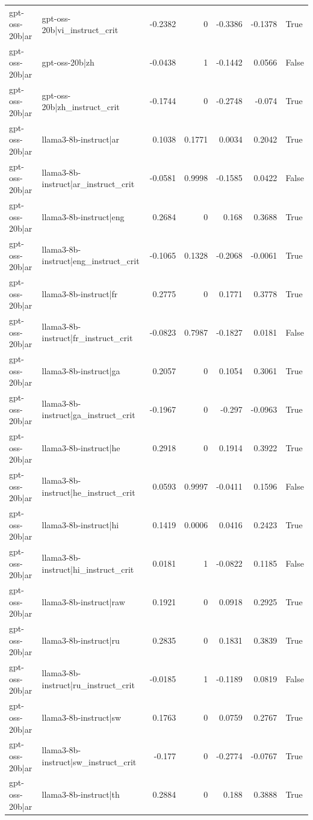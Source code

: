 \begin{table}
\begin{tabular}{l l r r r r l}
gpt-oss-20b|ar & gpt-oss-20b|vi_instruct_crit & -0.2382 & 0 & -0.3386 & -0.1378 & True \\
gpt-oss-20b|ar & gpt-oss-20b|zh & -0.0438 & 1 & -0.1442 & 0.0566 & False \\
gpt-oss-20b|ar & gpt-oss-20b|zh_instruct_crit & -0.1744 & 0 & -0.2748 & -0.074 & True \\
gpt-oss-20b|ar & llama3-8b-instruct|ar & 0.1038 & 0.1771 & 0.0034 & 0.2042 & True \\
gpt-oss-20b|ar & llama3-8b-instruct|ar_instruct_crit & -0.0581 & 0.9998 & -0.1585 & 0.0422 & False \\
gpt-oss-20b|ar & llama3-8b-instruct|eng & 0.2684 & 0 & 0.168 & 0.3688 & True \\
gpt-oss-20b|ar & llama3-8b-instruct|eng_instruct_crit & -0.1065 & 0.1328 & -0.2068 & -0.0061 & True \\
gpt-oss-20b|ar & llama3-8b-instruct|fr & 0.2775 & 0 & 0.1771 & 0.3778 & True \\
gpt-oss-20b|ar & llama3-8b-instruct|fr_instruct_crit & -0.0823 & 0.7987 & -0.1827 & 0.0181 & False \\
gpt-oss-20b|ar & llama3-8b-instruct|ga & 0.2057 & 0 & 0.1054 & 0.3061 & True \\
gpt-oss-20b|ar & llama3-8b-instruct|ga_instruct_crit & -0.1967 & 0 & -0.297 & -0.0963 & True \\
gpt-oss-20b|ar & llama3-8b-instruct|he & 0.2918 & 0 & 0.1914 & 0.3922 & True \\
gpt-oss-20b|ar & llama3-8b-instruct|he_instruct_crit & 0.0593 & 0.9997 & -0.0411 & 0.1596 & False \\
gpt-oss-20b|ar & llama3-8b-instruct|hi & 0.1419 & 0.0006 & 0.0416 & 0.2423 & True \\
gpt-oss-20b|ar & llama3-8b-instruct|hi_instruct_crit & 0.0181 & 1 & -0.0822 & 0.1185 & False \\
gpt-oss-20b|ar & llama3-8b-instruct|raw & 0.1921 & 0 & 0.0918 & 0.2925 & True \\
gpt-oss-20b|ar & llama3-8b-instruct|ru & 0.2835 & 0 & 0.1831 & 0.3839 & True \\
gpt-oss-20b|ar & llama3-8b-instruct|ru_instruct_crit & -0.0185 & 1 & -0.1189 & 0.0819 & False \\
gpt-oss-20b|ar & llama3-8b-instruct|sw & 0.1763 & 0 & 0.0759 & 0.2767 & True \\
gpt-oss-20b|ar & llama3-8b-instruct|sw_instruct_crit & -0.177 & 0 & -0.2774 & -0.0767 & True \\
gpt-oss-20b|ar & llama3-8b-instruct|th & 0.2884 & 0 & 0.188 & 0.3888 & True \\

\end{tabular}
\end{table}
